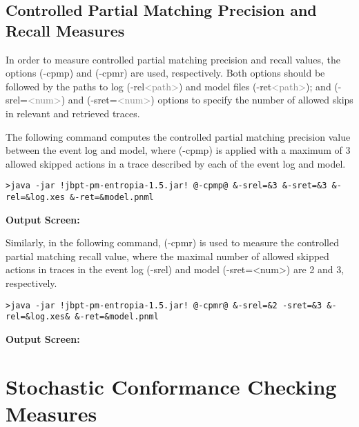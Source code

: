 \documentclass{article}
\begin{document}
\subsection{Controlled Partial Matching Precision and Recall Measures}
In order to measure controlled partial matching precision and recall values, the options (\textcolor{darkcandyapplered}{\footnotesize\ttfamily-cpmp}) and (\textcolor{darkcandyapplered}{\footnotesize\ttfamily-cpmr}) are used, respectively. Both options should be followed by the paths to log (\textcolor{ao}{\footnotesize\ttfamily-rel}\textcolor{gray}{\footnotesize\ttfamily<path>}) and model files (\textcolor{ao}{\footnotesize\ttfamily-ret}\textcolor{gray}{\footnotesize\ttfamily<path>}); and (\textcolor{ao}{\footnotesize\ttfamily-srel=}\textcolor{gray}{\footnotesize\ttfamily<num>}) and (\textcolor{ao}{\footnotesize\ttfamily-sret=}\textcolor{gray}{\footnotesize\ttfamily<num>}) options to specify the number of allowed skips in relevant and retrieved traces. 

The following command computes the controlled partial matching precision value between the event log and model, where (\textcolor{darkcandyapplered}{\footnotesize\ttfamily-cpmp}) is applied with a maximum of 3 allowed skipped actions in a trace described by each of the event log and model.
\begin{lstlisting}[style=CL]
>java -jar !jbpt-pm-entropia-1.5.jar! @-cpmp@ &-srel=&3 &-sret=&3 &-rel=&log.xes &-ret=&model.pnml
\end{lstlisting}
\textbf{Output Screen:}%


Similarly, in the following command, (\textcolor{darkcandyapplered}{\footnotesize\ttfamily-cpmr}) is used to measure the  controlled partial matching recall value, where the maximal number of allowed skipped actions in traces in the event log (\textcolor{ao}{\footnotesize\ttfamily-srel}) and model (\textcolor{ao}{\footnotesize\ttfamily-sret=<num>}) are 2 and 3, respectively.
\begin{lstlisting}[style=CL]
>java -jar !jbpt-pm-entropia-1.5.jar! @-cpmr@ &-srel=&2 -sret=&3 &-rel=&log.xes& &-ret=&model.pnml
\end{lstlisting}
\textbf{Output Screen:}%


\section*{Stochastic Conformance Checking Measures}
\setcounter{subsection}{0}
\end{document}

